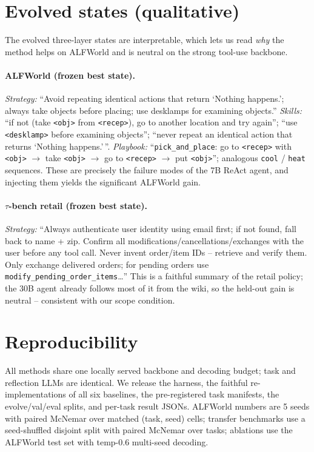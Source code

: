 \documentclass{article}
\begin{document}



\appendix
\section{Evolved states (qualitative)}
\label{app:states}
The evolved three-layer states are interpretable, which lets us read \emph{why} the
method helps on ALFWorld and is neutral on the strong tool-use backbone.

\paragraph{ALFWorld (frozen best state).}
\textit{Strategy:} ``Avoid repeating identical actions that return `Nothing
happens.'; always take objects before placing; use desklamps for examining
objects.''
\textit{Skills:} ``if not (take \texttt{<obj>} from \texttt{<recep>}), go to another
location and try again''; ``use \texttt{<desklamp>} before examining objects'';
``never repeat an identical action that returns `Nothing happens.'\,''.
\textit{Playbook:} ``\texttt{pick\_and\_place}: go to \texttt{<recep>} with
\texttt{<obj>} $\rightarrow$ take \texttt{<obj>} $\rightarrow$ go to \texttt{<recep>}
$\rightarrow$ put \texttt{<obj>}''; analogous \texttt{cool} / \texttt{heat}
sequences. These are precisely the failure modes of the 7B ReAct agent, and injecting
them yields the significant ALFWorld gain.

\paragraph{$\tau$-bench retail (frozen best state).}
\textit{Strategy:} ``Always authenticate user identity using email first; if not
found, fall back to name + zip. Confirm all modifications/cancellations/exchanges
with the user before any tool call. Never invent order/item IDs -- retrieve and
verify them. Only exchange delivered orders; for pending orders use
\texttt{modify\_pending\_order\_items}\ldots'' This is a faithful summary of the
retail policy; the 30B agent already follows most of it from the wiki, so the
held-out gain is neutral -- consistent with our scope condition.

\section{Reproducibility}
All methods share one locally served backbone and decoding budget; task and
reflection LLMs are identical. We release the harness, the faithful
re-implementations of all six baselines, the pre-registered task manifests, the
evolve/val/eval splits, and per-task result JSONs. ALFWorld numbers are 5 seeds with
paired McNemar over matched (task, seed) cells; transfer benchmarks use a
seed-shuffled disjoint split with paired McNemar over tasks; ablations use the
ALFWorld test set with temp-0.6 multi-seed decoding.
\end{document}
